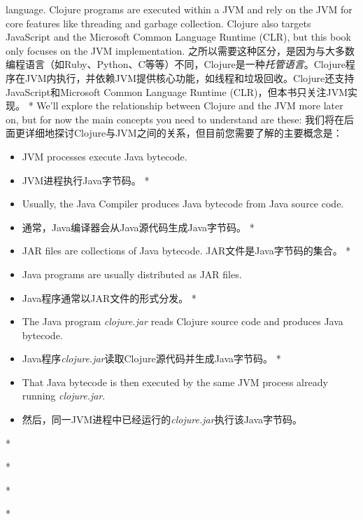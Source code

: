 \begin{paracol}{2}
{language}. Clojure programs are executed within a JVM and rely on the
JVM for core features like threading and garbage collection. Clojure
also targets JavaScript and the Microsoft Common Language Runtime (CLR),
but this book only focuses on the JVM implementation.
\switchcolumn
之所以需要这种区分，是因为与大多数编程语言（如Ruby、Python、C等等）不同，Clojure是一种\emph{托管语言}。Clojure程序在JVM内执行，并依赖JVM提供核心功能，如线程和垃圾回收。Clojure还支持JavaScript和Microsoft Common Language Runtime (CLR)，但本书只关注JVM实现。
\switchcolumn[0]*
We'll explore the relationship between Clojure and the JVM more later
on, but for now the main concepts you need to understand are these:
\switchcolumn
我们将在后面更详细地探讨Clojure与JVM之间的关系，但目前您需要了解的主要概念是：
\begin{itemize}
\switchcolumn[0]*
\item JVM processes execute Java bytecode.
\switchcolumn
\item JVM进程执行Java字节码。
\switchcolumn[0]*
\item Usually, the Java Compiler produces Java bytecode from Java source
code.
\switchcolumn
\item 通常，Java编译器会从Java源代码生成Java字节码。
\switchcolumn[0]*
\item JAR files are collections of Java bytecode.
\switchcolumn
JAR文件是Java字节码的集合。
\switchcolumn[0]*
\item Java programs are usually distributed as JAR files.
\switchcolumn
\item Java程序通常以JAR文件的形式分发。
\switchcolumn[0]*
\item The Java program \emph{clojure.jar} reads Clojure source code and
produces Java bytecode.
\switchcolumn
\item Java程序\emph{clojure.jar}读取Clojure源代码并生成Java字节码。
\switchcolumn[0]*
\item That Java bytecode is then executed by the same JVM process already
running \emph{clojure.jar}.
\switchcolumn
\item 然后，同一JVM进程中已经运行的\emph{clojure.jar}执行该Java字节码。
\end{itemize}
\switchcolumn[0]*

\switchcolumn

\switchcolumn[0]*

\switchcolumn

\switchcolumn[0]*

\switchcolumn

\switchcolumn[0]*


\end{paracol}
